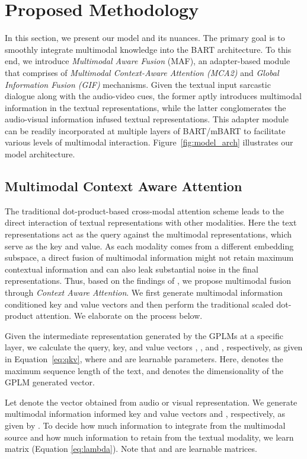 \documentclass[11pt]{article}
\newcommand{\model}{\textsc{MAF}}
\begin{document}
\section{Proposed Methodology}
In this section, we present our model and its nuances. The primary goal is to smoothly integrate multimodal knowledge into the BART architecture. To this end, we introduce \textit{Multimodal Aware Fusion} (\model), an adapter-based module that comprises of \textit{Multimodal Context-Aware Attention (MCA2)} and \textit{Global Information Fusion (GIF)} mechanisms. Given the textual input sarcastic dialogue along with the audio-video cues, the former aptly introduces multimodal information in the textual representations, while the latter conglomerates the audio-visual information infused textual representations. This adapter module can be readily incorporated at multiple layers of BART/mBART to facilitate various levels of multimodal interaction. Figure~\ref{fig:model_arch} illustrates our model architecture.

\subsection{Multimodal Context Aware Attention}
The traditional dot-product-based cross-modal attention scheme leads to the direct interaction of textual representations with other modalities. Here the text representations act as the query against the multimodal representations, which serve as the key and value. As each modality comes from a different embedding subspace, a direct fusion of multimodal information might not retain maximum contextual information and can also leak substantial noise in the final representations. Thus, based on the findings of \citet{Yang_Li_Wong_Chao_Wang_Tu_2019}, we propose multimodal fusion through \textit{Context Aware Attention}. We first generate multimodal information conditioned key and value vectors and then perform the traditional scaled dot-product attention. We elaborate on the process below.

Given the intermediate representation  generated by the GPLMs at a specific layer, we calculate the query, key, and value vectors , , and  , respectively, as given in Equation~\ref{eq:qkv}, where  and  are learnable parameters. Here,  denotes the maximum sequence length of the text, and  denotes the dimensionality of the GPLM generated vector.


Let  denote the vector obtained from audio or visual representation. We generate multimodal information informed key and value vectors  and , respectively, as given by \citet{Yang_Li_Wong_Chao_Wang_Tu_2019}. To decide how much information to integrate from the multimodal source and how much information to retain from the textual modality, we learn matrix  (Equation \ref{eq:lambda}). Note that  and  are learnable matrices.
\end{document}

